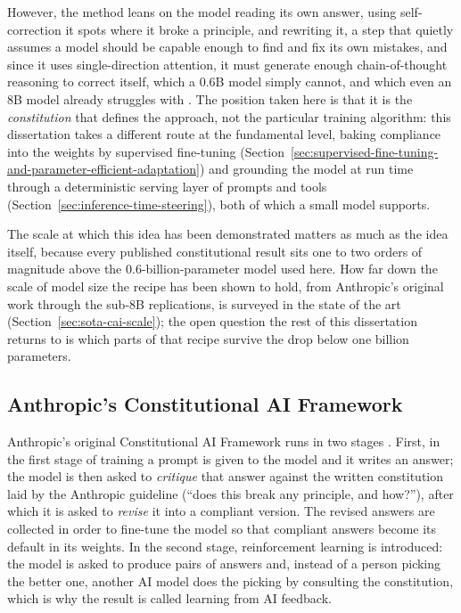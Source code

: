 However, the method leans on the model reading its own answer, using self-correction it spots where it broke a principle, and rewriting it, a step that quietly assumes a model should be capable enough to find and fix its own mistakes, and since it uses single-direction attention, it must generate enough chain-of-thought reasoning to correct itself, which a 0.6B model simply cannot, and which even an 8B model already struggles with \cite{zhang2025constitutioncollapseexploringconstitutional}. The position taken here is that it is the \emph{constitution} that defines the approach, not the particular training algorithm: this dissertation takes a different route at the fundamental level, baking compliance into the weights by supervised fine-tuning (Section~\ref{sec:supervised-fine-tuning-and-parameter-efficient-adaptation}) and grounding the model at run time through a deterministic serving layer of prompts and tools (Section~\ref{sec:inference-time-steering}), both of which a small model supports.

The scale at which this idea has been demonstrated matters as much as the idea itself, because every published constitutional result sits one to two orders of magnitude above the 0.6-billion-parameter model used here. How far down the scale of model size the recipe has been shown to hold, from Anthropic's original work through the sub-8B replications, is surveyed in the state of the art (Section~\ref{sec:sota-cai-scale}); the open question the rest of this dissertation returns to is which parts of that recipe survive the drop below one billion parameters.

\subsection{Anthropic's Constitutional AI Framework}
\label{subsec:anthropics-constitutional-ai-framework}

Anthropic's original Constitutional AI Framework runs in two stages \cite{bai2022constitutionalaiharmlessnessai}. First, in the first stage of training a prompt is given to the model and it writes an answer; the model is then asked to \emph{critique} that answer against the written constitution laid by the Anthropic guideline (``does this break any principle, and how?''), after which it is asked to \emph{revise} it into a compliant version. The revised answers are collected in order to fine-tune the model so that compliant answers become its default in its weights. In the second stage, reinforcement learning is introduced: the model is asked to produce pairs of answers and, instead of a person picking the better one, another AI model does the picking by consulting the constitution, which is why the result is called learning from AI feedback.

